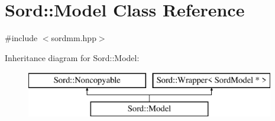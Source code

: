 \hypertarget{class_sord_1_1_model}{}\section{Sord\+:\+:Model Class Reference}
\label{class_sord_1_1_model}


{\ttfamily \#include $<$sordmm.\+hpp$>$}

Inheritance diagram for Sord\+:\+:Model\+:\begin{figure}[H]
\begin{center}
\leavevmode
\includegraphics[height=2.000000cm]{class_sord_1_1_model}
\end{center}
\end{figure}
